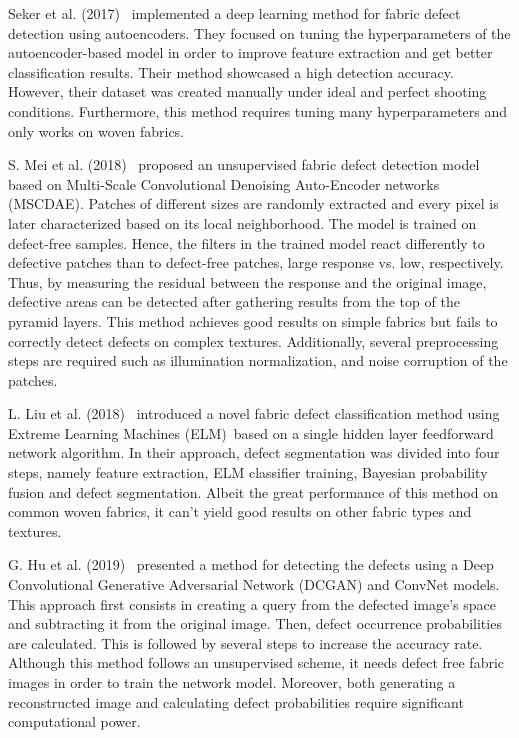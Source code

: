 \documentclass[3p,,preprint,review,12pt]{elsarticle}
\begin{document}
Seker et al. (2017)\unskip~\cite{981091:21201185} implemented a deep learning method for fabric defect detection using autoencoders. They focused on tuning the hyperparameters of the autoencoder-based model in order to improve feature extraction and get better classification results. Their method showcased a high detection accuracy. However, their dataset was created manually under ideal and perfect shooting conditions. Furthermore, this method requires tuning many hyperparameters and only works on woven fabrics.

S. Mei et al. (2018)\unskip~\cite{981091:21201198} proposed an unsupervised fabric defect detection model based on Multi-Scale Convolutional Denoising Auto-Encoder networks (MSCDAE). Patches of different sizes are randomly extracted and every pixel is later characterized based on its local neighborhood. The model is trained on defect-free samples. Hence, the filters in the trained model react differently to defective patches than to defect-free patches, large response vs. low, respectively. Thus, by measuring the residual between the response and the original image, defective areas can be detected after gathering results from the top of the pyramid layers. This method achieves good results on simple fabrics but fails to correctly detect defects on complex textures. Additionally, several preprocessing steps are required such as illumination normalization, and noise corruption of the patches. 

L. Liu et al. (2018)\unskip~\cite{981091:21201197} introduced a novel fabric defect classification method using Extreme Learning Machines (ELM)~based on a single hidden layer feedforward network algorithm. In their approach, defect segmentation was divided into four steps, namely feature extraction, ELM classifier training, Bayesian probability fusion and defect segmentation. Albeit the great performance of this method on common woven fabrics, it can't yield good results on other fabric types and textures. 

G. Hu et al. (2019)\unskip~\cite{981091:21201204} presented a method for detecting the defects using a Deep Convolutional Generative
Adversarial Network (DCGAN) and ConvNet models. This approach first consists in creating a query from the defected image's space and subtracting it from the original image. Then, defect occurrence probabilities are calculated. This is followed by several steps to increase the accuracy rate. Although this method follows an unsupervised scheme, it needs defect free fabric images in order to train the network model. Moreover, both generating a reconstructed image and calculating defect probabilities require significant computational power. 
\end{document}
